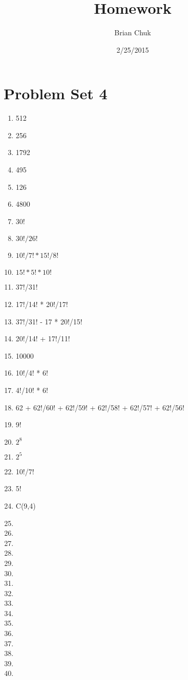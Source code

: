 \documentclass[11pt]{article}
\title{\textbf{Homework}}
\author{Brian Chuk}
\date{2/25/2015}
\begin{document}
\maketitle

\section{Problem Set 4}
\begin{enumerate}

\item 512
\item 256
\item 1792
\item 495
\item 126
\item 4800
\item 30!
\item $30!/26!$
\item $10!/7! * 15!/8!$
\item $15! * 5! * 10!$
\item 37!/31!
\item 17!/14! * 20!/17!
\item 37!/31! - 17 * 20!/15!
\item 20!/14! + 17!/11!
\item 10000
\item 10!/4! * 6!
\item 4!/10! * 6!
\item 62 + 62!/60! + 62!/59! + 62!/58! + 62!/57! + 62!/56!
\item 9!
\item $2^8$
\item $2^5$
\item 10!/7!
\item 5!
\item C(9,4)
\item 
\item 
\item 
\item 
\item 
\item 
\item 
\item 
\item 
\item 
\item 
\item 
\item 
\item 
\item 
\item 
\end{enumerate}
\end{document}
